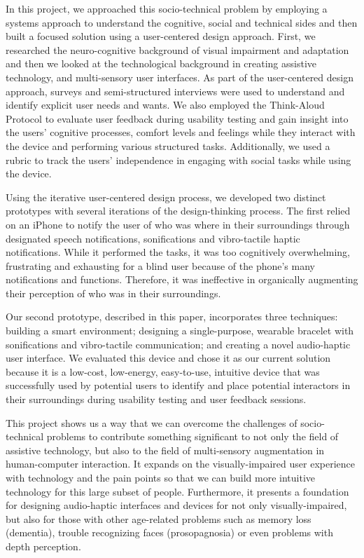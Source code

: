 In this project, we approached this socio-technical problem by employing a systems approach to understand the cognitive, social and technical sides and then built a focused solution using a user-centered design approach. First, we researched the neuro-cognitive background of visual impairment and adaptation and then we looked at the technological background in creating assistive technology, and multi-sensory user interfaces. As part of the user-centered design approach, surveys and semi-structured interviews were used to understand and identify explicit user needs and wants. We also employed the Think-Aloud Protocol to evaluate user feedback during usability testing and gain insight into the users' cognitive processes, comfort levels and feelings while they interact with the device and performing various structured tasks. Additionally, we used a rubric to track the users' independence in engaging with social tasks while using the device.

Using the iterative user-centered design process, we developed two distinct prototypes with several iterations of the design-thinking process. The first relied on an iPhone to notify the user of who was where in their surroundings through designated speech notifications, sonifications and vibro-tactile haptic notifications. While it performed the tasks, it was too cognitively overwhelming, frustrating and exhausting for a blind user because of the phone's many notifications and functions. Therefore, it was ineffective in organically augmenting their perception of who was in their surroundings.

Our second prototype, described in this paper, incorporates three techniques: building a smart environment; designing a single-purpose, wearable bracelet with sonifications and vibro-tactile communication; and creating a novel audio-haptic user interface. We evaluated this device and chose it as our current solution because it is a low-cost, low-energy, easy-to-use, intuitive device that was successfully used by potential users to identify and place potential interactors in their surroundings during usability testing and user feedback sessions. 

This project shows us a way that we can overcome the challenges of socio-technical problems to contribute something significant to not only the field of assistive technology, but also to the field of multi-sensory augmentation in human-computer interaction. It expands on the visually-impaired user experience with technology and the pain points so that we can build more intuitive technology for this large subset of people. Furthermore, it presents a foundation for designing audio-haptic interfaces and devices for not only visually-impaired, but also for those with other age-related problems such as memory loss (dementia), trouble recognizing faces (prosopagnosia) or even problems with depth perception.

